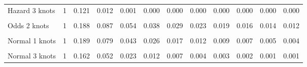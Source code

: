 \documentclass[
]{article}
\begin{document}
\begin{table}[H]
{\begin{tabular}[t]{lrrrrrrrrrrr}
Hazard 3 knots & 1 & 0.121 & 0.012 & 0.001 & 0.000 & 0.000 & 0.000 & 0.000 & 0.000 & 0.000 & 0.000\\
\cellcolor{gray!10}{Odds 1 knots} & \cellcolor{gray!10}{1} & \cellcolor{gray!10}{0.205} & \cellcolor{gray!10}{0.105} & \cellcolor{gray!10}{0.069} & \cellcolor{gray!10}{0.051} & \cellcolor{gray!10}{0.040} & \cellcolor{gray!10}{0.033} & \cellcolor{gray!10}{0.027} & \cellcolor{gray!10}{0.024} & \cellcolor{gray!10}{0.021} & \cellcolor{gray!10}{0.018}\\
Odds 2 knots & 1 & 0.188 & 0.087 & 0.054 & 0.038 & 0.029 & 0.023 & 0.019 & 0.016 & 0.014 & 0.012\\
\cellcolor{gray!10}{Odds 3 knots} & \cellcolor{gray!10}{1} & \cellcolor{gray!10}{0.168} & \cellcolor{gray!10}{0.067} & \cellcolor{gray!10}{0.037} & \cellcolor{gray!10}{0.025} & \cellcolor{gray!10}{0.018} & \cellcolor{gray!10}{0.014} & \cellcolor{gray!10}{0.011} & \cellcolor{gray!10}{0.009} & \cellcolor{gray!10}{0.007} & \cellcolor{gray!10}{0.006}\\
Normal 1 knots & 1 & 0.189 & 0.079 & 0.043 & 0.026 & 0.017 & 0.012 & 0.009 & 0.007 & 0.005 & 0.004\\
\cellcolor{gray!10}{Normal 2 knots} & \cellcolor{gray!10}{1} & \cellcolor{gray!10}{0.188} & \cellcolor{gray!10}{0.078} & \cellcolor{gray!10}{0.042} & \cellcolor{gray!10}{0.025} & \cellcolor{gray!10}{0.017} & \cellcolor{gray!10}{0.012} & \cellcolor{gray!10}{0.009} & \cellcolor{gray!10}{0.006} & \cellcolor{gray!10}{0.005} & \cellcolor{gray!10}{0.004}\\
Normal 3 knots & 1 & 0.162 & 0.052 & 0.023 & 0.012 & 0.007 & 0.004 & 0.003 & 0.002 & 0.001 & 0.001\\
\bottomrule
\end{tabular}}
\end{table}
\end{document}
